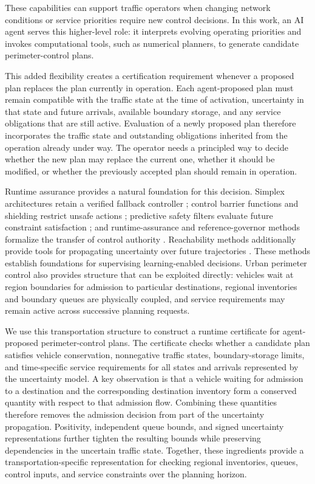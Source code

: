 \documentclass[journal,10pt]{IEEEtran}
\begin{document}
These capabilities can support traffic operators when changing network
conditions or service priorities require new control decisions. In this
work, an AI agent serves this higher-level role: it interprets evolving
operating priorities and invokes computational tools, such as numerical
planners, to generate candidate perimeter-control plans.

This added flexibility creates a certification requirement whenever a
proposed plan replaces the plan currently in operation. Each agent-proposed
plan must remain compatible with the traffic state at the time of
activation, uncertainty in that state and future arrivals, available
boundary storage, and any service obligations that are still active.
Evaluation of a newly proposed plan therefore incorporates the traffic state
and outstanding obligations inherited from the operation already under way.
The operator needs a principled way to decide whether the new plan may
replace the current one, whether it should be modified, or whether the
previously accepted plan should remain in operation.

Runtime assurance provides a natural foundation for this decision. Simplex
architectures retain a verified fallback controller
\cite{simplex,mehmood2022black}; control barrier functions and shielding
restrict unsafe actions \cite{ames2017,alshiekh2018}; predictive safety
filters evaluate future constraint satisfaction
\cite{wabersich2021,hsu2023safety}; and runtime-assurance and
reference-governor methods formalize the transfer of control authority
\cite{fisac2019,hobbs2023runtime,gilbert2002generalized,garone2017reference}.
Reachability methods additionally provide tools for propagating uncertainty
over future trajectories \cite{coogan2020mixed,kochdumper2021sparse}. These
methods establish foundations for supervising learning-enabled decisions.
Urban perimeter control also provides structure that can be exploited
directly: vehicles wait at region boundaries for admission to particular
destinations, regional inventories and boundary queues are physically
coupled, and service requirements may remain active across successive
planning requests.

We use this transportation structure to construct a runtime certificate for
agent-proposed perimeter-control plans. The certificate checks whether a
candidate plan satisfies vehicle conservation, nonnegative traffic states,
boundary-storage limits, and time-specific service requirements for all
states and arrivals represented by the uncertainty model. A key observation
is that a vehicle waiting for admission to a destination and the
corresponding destination inventory form a conserved quantity with respect
to that admission flow. Combining these quantities therefore removes the
admission decision from part of the uncertainty propagation. Positivity,
independent queue bounds, and signed uncertainty representations further
tighten the resulting bounds while preserving dependencies in the uncertain
traffic state. Together, these ingredients provide a transportation-specific
representation for checking regional inventories, queues, control inputs,
and service constraints over the planning horizon.
\end{document}
